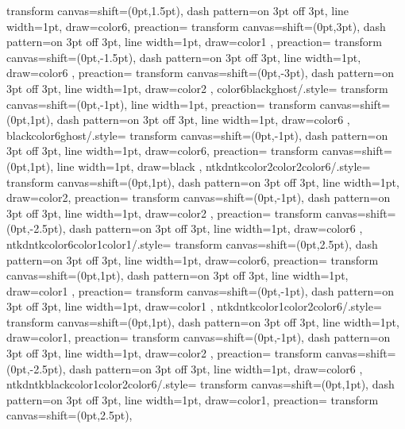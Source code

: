 {{    transform canvas={shift={(0pt,1.5pt)}},
    dash pattern=on 3pt off 3pt,
    line width=1pt,
    draw=color6,
    preaction={
      transform canvas={shift={(0pt,3pt)}},
      dash pattern=on 3pt off 3pt,
      line width=1pt,
      draw=color1
      },
    preaction={
      transform canvas={shift={(0pt,-1.5pt)}},
      dash pattern=on 3pt off 3pt,
      line width=1pt,
      draw=color6
      },
    preaction={
      transform canvas={shift={(0pt,-3pt)}},
      dash pattern=on 3pt off 3pt,
      line width=1pt,
      draw=color2
      }  
    },
    color6blackghost/.style={
    transform canvas={shift={(0pt,-1pt)}},
    line width=1pt,
    preaction={
      transform canvas={shift={(0pt,1pt)}},
      dash pattern=on 3pt off 3pt,
      line width=1pt,
      draw=color6
    }
    },
    blackcolor6ghost/.style={
    transform canvas={shift={(0pt,-1pt)}},
    dash pattern=on 3pt off 3pt,
    line width=1pt,
    draw=color6,
    preaction={
      transform canvas={shift={(0pt,1pt)}},
      line width=1pt,
      draw=black
    }
    },
    ntkdntkcolor2color2color6/.style={
    transform canvas={shift={(0pt,1pt)}},
    dash pattern=on 3pt off 3pt,
    line width=1pt,
    draw=color2,
    preaction={
      transform canvas={shift={(0pt,-1pt)}},
      dash pattern=on 3pt off 3pt,
      line width=1pt,
      draw=color2
      },
    preaction={
      transform canvas={shift={(0pt,-2.5pt)}},
      dash pattern=on 3pt off 3pt,
      line width=1pt,
      draw=color6
      }  
    },
    ntkdntkcolor6color1color1/.style={
    transform canvas={shift={(0pt,2.5pt)}},
    dash pattern=on 3pt off 3pt,
    line width=1pt,
    draw=color6,
    preaction={
      transform canvas={shift={(0pt,1pt)}},
      dash pattern=on 3pt off 3pt,
      line width=1pt,
      draw=color1
      },
    preaction={
      transform canvas={shift={(0pt,-1pt)}},
      dash pattern=on 3pt off 3pt,
      line width=1pt,
      draw=color1
      }  
    },
    ntkdntkcolor1color2color6/.style={
    transform canvas={shift={(0pt,1pt)}},
    dash pattern=on 3pt off 3pt,
    line width=1pt,
    draw=color1,
    preaction={
      transform canvas={shift={(0pt,-1pt)}},
      dash pattern=on 3pt off 3pt,
      line width=1pt,
      draw=color2
      },
    preaction={
      transform canvas={shift={(0pt,-2.5pt)}},
      dash pattern=on 3pt off 3pt,
      line width=1pt,
      draw=color6
      }  
    },
    ntkdntkblackcolor1color2color6/.style={
    transform canvas={shift={(0pt,1pt)}},
    dash pattern=on 3pt off 3pt,
    line width=1pt,
    draw=color1,
    preaction={
      transform canvas={shift={(0pt,2.5pt)}},
}}}
